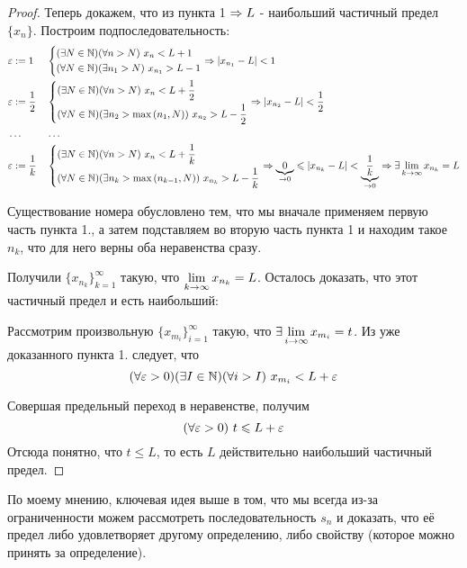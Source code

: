 \begin{proof}
	
	Теперь докажем, что из пункта 1 $\Rightarrow L$ - наибольший частичный
	предел $\{x_n\}$. Построим подпоследовательность:
	\begin{align*}
		&\varepsilon := 1 & &\left\{\begin{aligned}&(\exists N \in \mathbb{N})(\forall n > N)
		\ x_n < L + 1
		\\ &(\forall N \in \mathbb{N})(\exists n_1 > N)\ x_{n_1} > L - 1\end{aligned}\right.
		\Rightarrow |x_{n_1} - L| < 1
		\\
		&\varepsilon := \frac{1}{2} & &\left\{\begin{aligned}&(\exists N \in \mathbb{N})
		(\forall n > N)\ x_n < L + \frac{1}{2}
		\\ &(\forall N \in \mathbb{N})(\exists n_2 > \max{(n_1, N)})
		\ x_{n_2} > L - \frac{1}{2}\end{aligned}\right. \Rightarrow |x_{n_2} - L| < \frac{1}{2}
		\\
		&\dots& & \dots
		\\
		&\varepsilon := \frac{1}{k} & &\left\{\begin{aligned}&(\exists N \in \mathbb{N})
		(\forall n > N)\ x_n < L + \frac{1}{k}
		\\ &(\forall N \in \mathbb{N})(\exists n_k > \max{(n_{k - 1}, N)})
		\ x_{n_k} > L - \frac{1}{k}\end{aligned}\right. \Rightarrow \underbrace{0}_{\to 0} \leqslant
		|x_{n_k} - L| < \underbrace{\frac{1}{k}}_{\to 0}\Rightarrow \exists
		\lim\limits_{k \to \infty} x_{n_k} = L
	\end{align*}



	Существование номера обусловлено тем, что мы вначале
	применяем первую часть пункта 1., а затем подставляем во
	вторую часть пункта 1 и находим такое $n_k$, что для него
	верны оба неравенства сразу.
	
	Получили $\{x_{n_k}\}_{k = 1}^\infty$ такую, что
	$\lim\limits_{k \to \infty} x_{n_k} = L$. Осталось доказать, что
	этот частичный предел и есть наибольший:
	
	Рассмотрим произвольную $\{x_{m_i}\}_{i = 1}^\infty$ такую,
	что $\exists \lim\limits_{i \to \infty} x_{m_i} = t$.
	Из уже доказанного пункта 1. следует, что
	\[
		(\forall \varepsilon > 0)(\exists I \in \mathbb{N})(\forall i > I)
		\ x_{m_i} < L + \varepsilon
	\]
	
	Совершая предельный переход в неравенстве, получим
	\[
		(\forall \varepsilon > 0)\ t \leqslant L + \varepsilon
	\]
	Отсюда понятно, что $t \le L$, то есть $L$ действительно наибольший
	частичный предел.
\end{proof}

\begin{anote}
	По моему мнению, ключевая идея выше в том, что мы всегда
	из-за ограниченности можем рассмотреть последовательность
	$s_n$ и доказать, что её предел либо удовлетворяет другому
	определению, либо свойству (которое можно принять за
	определение).
\end{anote}

